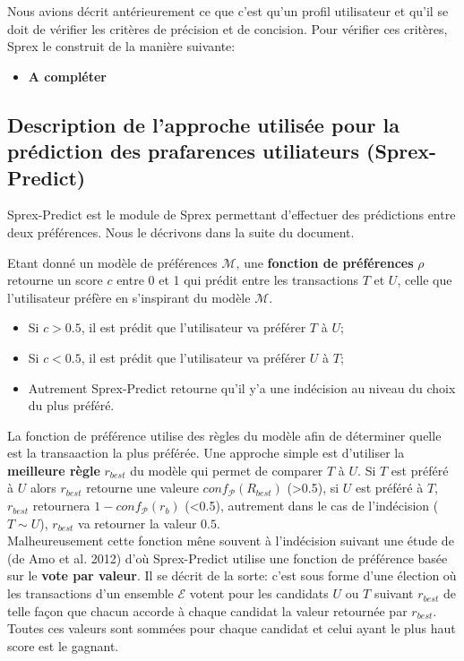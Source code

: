 \documentclass[a4paper,12pt,openany,oneside]{article}
\begin{document}
Nous avions décrit antérieurement ce que c'est qu'un profil utilisateur et qu'il se doit de vérifier les critères de précision et de concision. Pour vérifier ces critères, Sprex le construit de la manière suivante:
\begin{itemize}
\item \textbf{A compléter}
\end{itemize}






\subsection{Description de l'approche utilisée pour la prédiction des prafarences utiliateurs (Sprex-Predict)}

Sprex-Predict est le module de Sprex permettant d'effectuer des prédictions entre deux préférences. Nous le décrivons dans la suite du document.

Etant donné un modèle de préférences $\mathcal{M}$, une \textbf{fonction de préférences} $\rho$ retourne un score $c$ entre 0 et 1 qui prédit entre les transactions $T$ et $U$, celle que l'utilisateur préfère en s'inspirant du modèle $\mathcal{M}$.
\begin{itemize}
\item Si $c>0.5$, il est prédit que l'utilisateur va préférer $T$ à $U$;
\item Si $c<0.5$, il est prédit que l'utilisateur va préférer $U$ à $T$;
\item Autrement Sprex-Predict retourne qu'il y'a une indécision au niveau du choix du plus préféré.
\end{itemize}

La fonction de préférence utilise des règles du modèle afin de déterminer quelle est la transaaction la plus préférée. 
Une approche simple est d'utiliser la \textbf{meilleure règle} $r_{best}$ du modèle qui permet de comparer $T$ à $U$.
Si $T$ est préféré à $U$ alors $r_{best}$ retourne une valeure $conf_\mathcal{P}(R_{best})$ (>0.5), si $U$ est préféré à $T$, $r_{best}$ retournera $1-conf_\mathcal{P}(r_b)$ (<0.5), autrement dans le cas de l'indécision ($T\sim U$), $r_{best}$ va retourner la valeur $0.5$.\\
Malheureusement cette fonction mêne souvent à l'indécision suivant une étude de (de Amo et al. 2012) d'où Sprex-Predict utilise une fonction de préférence basée sur le \textbf{vote par valeur}. Il se décrit de la sorte: c'est sous forme d'une élection où les transactions d'un ensemble $\mathcal{E}$ votent pour les candidats $U$ ou $T$ suivant $r_{best}$ de telle façon que chacun accorde à chaque candidat la valeur retournée par $r_{best}$. Toutes ces valeurs sont sommées pour chaque candidat et celui ayant le plus haut score est le gagnant.
\end{document}
